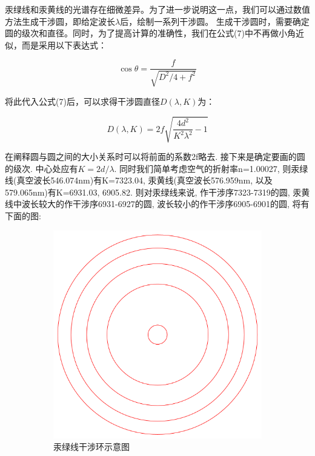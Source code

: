 \documentclass[12pt,a4paper]{article}
\newcommand{\be}[1]{
    \begin{equation}
        #1
    \end{equation}
}
\begin{document}
  汞绿线和汞黄线的光谱存在细微差异。为了进一步说明这一点，我们可以通过数值方法生成干涉圆，即给定波长$\lambda$后，绘制一系列干涉圆。
  生成干涉圆时，需要确定圆的级次和直径。同时，为了提高计算的准确性，我们在公式(7)中不再做小角近似，而是采用以下表达式：
\be{\cos{\theta}=\frac{f}{\sqrt{D^2/4+f^2}}}
将此代入公式(7)后，可以求得干涉圆直径$D(\lambda,K)$为：
\be{D(\lambda,K)=2f \sqrt{\frac{4d^2}{K^2\lambda^2}-1}}
在阐释圆与圆之间的大小关系时可以将前面的系数2f略去. 
接下来是确定要画的圆的级次. 中心处应有$K=2d/\lambda$. 同时我们简单考虑空气的折射率n=1.00027, 则汞绿线(真空波长546.074nm)有K=7323.04, 汞黄线(真空波长576.959nm, 以及579.065nm)有K=6931.03, 6905.82. 
则对汞绿线来说, 作干涉序7323-7319的圆, 汞黄线中波长较大的作干涉序6931-6927的圆, 波长较小的作干涉序6905-6901的圆, 将有下面的图\cite{塞曼效应实验中法布里-珀罗标准具的Matlab模拟}\cite{塞曼效应实验报告}: 
\begin{figure}[H]
    \centering
    \begin{subfigure}[b]{0.32\textwidth}
      \centering
      \includegraphics[width=\textwidth]{calc_g}
      \caption{汞绿线干涉环示意图}
    \end{subfigure}
    \hfill
    \begin{subfigure}[b]{0.32\textwidth}
      \centering

\end{subfigure}
\end{figure}
\end{document}
